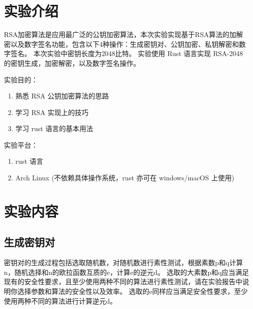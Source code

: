 \documentclass[degree=project,degree-type=project,cjk-font=noto]{thuthesis}
\begin{document}
\maketitle

\frontmatter
% 



\mainmatter

\chapter{实验介绍}
RSA加密算法是应用最广泛的公钥加密算法，本次实验实现基于RSA算法的加解密以及数字签名功能，包含以下4种操作：生成密钥对、公钥加密、私钥解密和数字签名。
本次实验中密钥长度为2048比特。
实验使用 Rust 语言实现 RSA-2048 的密钥生成，加密解密，以及数字签名操作。

实验目的：

\begin{enumerate}
    \item 熟悉 RSA 公钥加密算法的思路
    \item 学习 RSA 实现上的技巧
    \item 学习 rust 语言的基本用法
\end{enumerate}

实验平台：

\begin{enumerate}
    \item rust 语言
    \item Arch Linux (不依赖具体操作系统，rust 亦可在 windows/macOS 上使用)
\end{enumerate}

\chapter{实验内容}

\section{生成密钥对}

    密钥对的生成过程包括选取随机数，对随机数进行素性测试，根据素数p和q计算n，随机选择和n的欧拉函数互质的e，计算e的逆元d。
选取的大素数p和q应当满足现有的安全性要求，且至少使用两种不同的算法进行素性测试，请在实验报告中说明你选择参数和算法的安全性以及效率。
选取的e同样应当满足安全性要求，至少使用两种不同的算法进行计算逆元d。
\end{document}
